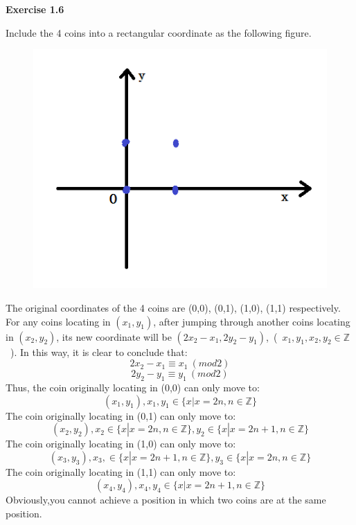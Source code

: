 \documentclass{article} %
\begin{document}
	
	\textbf{Exercise 1.6}\par
	Include the 4 coins into a rectangular coordinate as the following figure.
	\begin{figure}[H]
		\centering
		\includegraphics[scale=0.6]{1-6.png}
		\caption{}
		\label{fig:5}
	\end{figure}
	The original coordinates of the 4 coins are (0,0), (0,1), (1,0), (1,1) respectively.
	For any coins locating in $(x_1,y_1)$, after jumping through another coins locating in $(x_2,y_2)$, its new coordinate will be $(2x_2-x_1,2y_2-y_1)$,\  (\ $x_1,y_1,x_2,y_2 \in \mathbb{Z}$\ ).
	In this way, it is clear to conclude that: \\
	$$2x_2-x_1 \equiv x_1\ (mod 2)$$
	$$2y_2-y_1 \equiv y_1\ (mod 2)$$
	Thus, the coin originally locating in (0,0) can only move to: $$(x_1,y_1),x_1,y_1 \in \{x|x=2n,n\in\mathbb{Z}\} $$
	The coin originally locating in (0,1) can only move to: $$(x_2,y_2),x_2\in \{x|x=2n,n\in\mathbb{Z}\}, y_2\in\{x|x=2n+1,n\in\mathbb{Z}\} $$
	The coin originally locating in (1,0) can only move to: $$(x_3,y_3),x_3,\in \{x|x=2n+1,n\in\mathbb{Z}\},y_3\in\{x|x=2n,n\in\mathbb{Z}\} $$
	The coin originally locating in (1,1) can only move to: $$(x_4,y_4),x_4,y_4 \in \{x|x=2n+1,n\in\mathbb{Z}\} $$
	Obviously,you cannot achieve a position in which two coins are at the same position.\\
	
\end{document}
